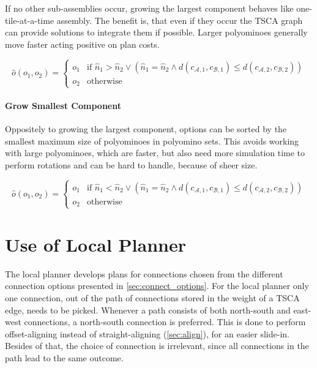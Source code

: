 If no other sub-assemblies occur, growing the largest component behaves like one-tile-at-a-time assembly.
The benefit is, that even if they occur the TSCA graph can provide solutions to integrate them if possible.
Larger polyominoes generally move faster acting positive on plan costs.

\begin{equation}
\hat{o}(o_1, o_2) =
\begin{cases}
o_1 & \text{if } \hat{n}_1 > \hat{n}_2 \lor \left( \hat{n}_1 = \hat{n}_2 \land d(c_{\mathcal{A},1}, c_{\mathcal{B},1}) \leq d(c_{\mathcal{A},2}, c_{\mathcal{B},2})\right) \\
o_2 & \text{otherwise}
\end{cases}
\end{equation}

\paragraph{Grow Smallest Component}

Oppositely to growing the largest component, options can be sorted by the smallest maximum size of polyominoes in polyomino sets.
This avoids working with large polyominoes, which are faster, but also need more simulation time to perform rotations and can be hard to handle, because of sheer size.

\begin{equation}
\hat{o}(o_1, o_2) =
\begin{cases}
o_1 & \text{if } \hat{n}_1 < \hat{n}_2 \lor \left( \hat{n}_1 = \hat{n}_2 \land d(c_{\mathcal{A},1}, c_{\mathcal{B},1}) \leq d(c_{\mathcal{A},2}, c_{\mathcal{B},2})\right) \\
o_2 & \text{otherwise}
\end{cases}
\end{equation}

\section{Use of Local Planner}
\label{sec:local_in_global}

The local planner develops plans for connections chosen from the different connection options presented in \autoref{sec:connect_options}.
For the local planner only one connection, out of the path of connections stored in the weight of a TSCA edge, needs to be picked.
Whenever a path consists of both north-south and east-west connections, a north-south connection is preferred.
This is done to perform offset-aligning instead of straight-aligning (\autoref{sec:align}), for an easier slide-in.
Besides of that, the choice of connection is irrelevant, since all connections in the path lead to the same outcome.

